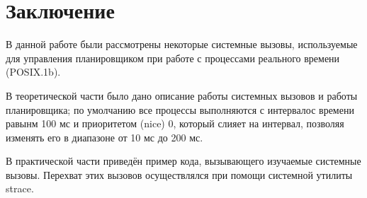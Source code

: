 \newpage
\section*{Заключение}

В данной работе были рассмотрены некоторые системные вызовы, используемые для управления планировщиком при работе с процессами реального времени (POSIX.1b).

В теоретической части было дано описание работы системных вызовов и работы планировщика; по умолчанию все процессы выполняются с интервалос времени равынм 100 мс и приоритетом (nice) 0, который слияет на интервал, позволяя изменять его в диапазоне от 10 мс до 200 мс.

В практической части приведён пример кода, вызывающего изучаемые системные вызовы. Перехват этих вызовов осуществлялся при помощи системной утилиты strace.